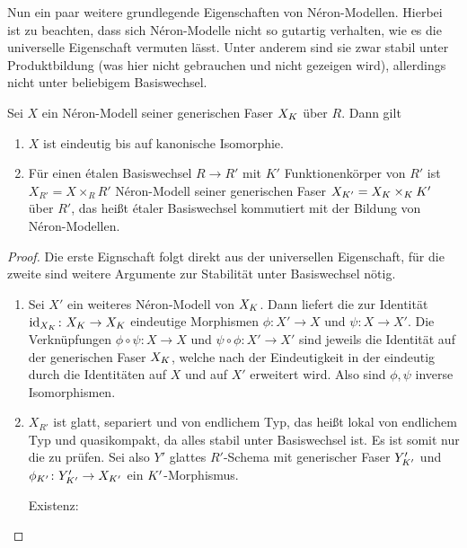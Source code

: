 Nun ein paar weitere grundlegende Eigenschaften von Néron-Modellen.
Hierbei ist zu beachten, dass sich Néron-Modelle nicht so gutartig
verhalten, wie es die universelle Eigenschaft vermuten lässt.
Unter anderem sind sie zwar stabil unter Produktbildung (was hier
nicht gebrauchen und nicht gezeigen wird), allerdings nicht unter
beliebigem Basiswechsel.
\begin{Satz}\label{thm:eigneronmodell}
  Sei $X$ ein Néron-Modell seiner generischen Faser $X_{K}$ über
  $R$. Dann gilt
  \begin{enumerate}[label=(\alph*)]
  \item $X$ ist eindeutig bis auf kanonische Isomorphie.
  \item Für einen étalen Basiswechsel $R\to R'$ mit $K'$
    Funktionenkörper von $R'$ ist $X_{R'}=X\times_R R'$ Néron-Modell
    seiner generischen Faser $X_{K'}=X_{K}\times_{K}K'$ über $R'$,
    das heißt étaler Basiswechsel kommutiert mit der Bildung von
    Néron-Modellen.
  \end{enumerate}
  \begin{proof}
    Die erste Eignschaft folgt direkt aus der universellen
    Eigenschaft, für die zweite sind weitere Argumente zur Stabilität
    unter Basiswechsel nötig. 
    \begin{enumerate}[resume*,start=1]
    \item Sei $X'$ ein weiteres Néron-Modell von $X_{K}$.
      Dann liefert die \NAbbEig zur Identität
      ${\mathrm{id}_{X_{K}}\colon X_{K}\to X_{K}}$ eindeutige Morphismen
      ${\phi\colon X'\to X}$ und ${\psi\colon X\to X'}$.
      Die Verknüpfungen ${\phi\circ\psi\colon X\to X}$ und
      ${\psi\circ\phi\colon X'\to X'}$ sind jeweils die Identität auf
      der generischen Faser $X_{K}$, welche nach der Eindeutigkeit in der
      \NAbbEig eindeutig durch die Identitäten auf
      $X$ und auf $X'$ erweitert wird. Also sind $\phi,\psi$ inverse
      Isomorphismen.
    \item
      $X_{R'}$ ist glatt, separiert und von endlichem Typ, das heißt
      lokal von endlichem Typ und quasikompakt, da alles 
      stabil unter Basiswechsel ist. Es ist somit nur die
      \NAbbEig zu prüfen.
      Sei also $Y'$ glattes $R'$-Schema mit generischer Faser
      $Y_{K'}'$ und ${\phi_{K'}\colon Y_{K'}'\to X_{K'}}$ ein
      $K'$-Morphismus. 
      \begin{description}
      \item[Existenz:] 

\end{description}
\end{enumerate}
\end{proof}
\end{Satz}
